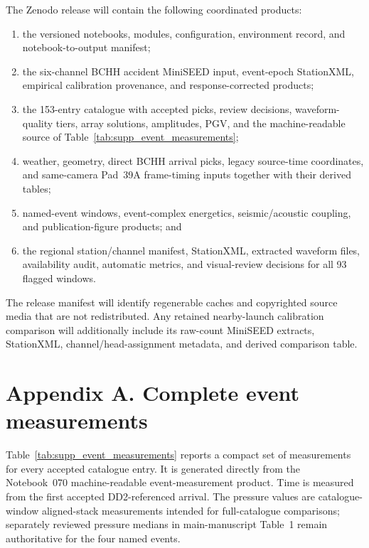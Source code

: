 \documentclass[]{seismica}
\begin{document}
The Zenodo release will contain the following coordinated products:
\begin{enumerate}
  \item the versioned notebooks, modules, configuration, environment record,
        and notebook-to-output manifest;
  \item the six-channel BCHH accident MiniSEED input, event-epoch StationXML,
        empirical calibration provenance, and response-corrected products;
  \item the 153-entry catalogue with accepted picks, review decisions,
        waveform-quality tiers, array solutions, amplitudes, PGV, and the
        machine-readable source of Table~\ref{tab:supp_event_measurements};
  \item weather, geometry, direct BCHH arrival picks, legacy source-time coordinates, and same-camera Pad~39A frame-timing inputs together with
        their derived tables;
  \item named-event windows, event-complex energetics, seismic/acoustic coupling, and
        publication-figure products; and
  \item the regional station/channel manifest, StationXML, extracted waveform
        files, availability audit, automatic metrics, and visual-review
        decisions for all 93 flagged windows.
\end{enumerate}
The release manifest will identify regenerable caches and copyrighted source
media that are not redistributed. Any retained nearby-launch calibration
comparison will additionally include its raw-count MiniSEED extracts,
StationXML, channel/head-assignment metadata, and derived comparison table.

\clearpage

\section*{Appendix A. Complete event measurements}
\label{app:supp_event_measurements}

Table~\ref{tab:supp_event_measurements} reports a compact set of measurements
for every accepted catalogue entry. It is generated directly from the
Notebook~070 machine-readable event-measurement product. Time is measured from
the first accepted DD2-referenced arrival. The pressure values are
catalogue-window aligned-stack measurements intended for full-catalogue
comparisons; separately reviewed pressure medians in main-manuscript Table~1
remain authoritative for the four named events.
\end{document}
